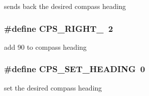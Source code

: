 sends back the desired compass heading \hypertarget{group__compass__commands_ga53ccdcb9ce75af6b95e56476367d2875}{
\subsubsection[{C\-P\-S\-\_\-\-R\-I\-G\-H\-T\-\_\-90}]{\setlength{\rightskip}{0pt plus 5cm}\#define C\-P\-S\-\_\-\-R\-I\-G\-H\-T\-\_~2}}\label{group__compass__commands_ga53ccdcb9ce75af6b95e56476367d2875}
add 90 to compass heading \hypertarget{group__compass__commands_ga10dbf50964cb04b6648e3b65502c0ff4}{
\subsubsection[{C\-P\-S\-\_\-\-S\-E\-T\-\_\-\-H\-E\-A\-D\-I\-N\-G}]{\setlength{\rightskip}{0pt plus 5cm}\#define C\-P\-S\-\_\-\-S\-E\-T\-\_\-\-H\-E\-A\-D\-I\-N\-G~0}}\label{group__compass__commands_ga10dbf50964cb04b6648e3b65502c0ff4}
set the desired compass heading 